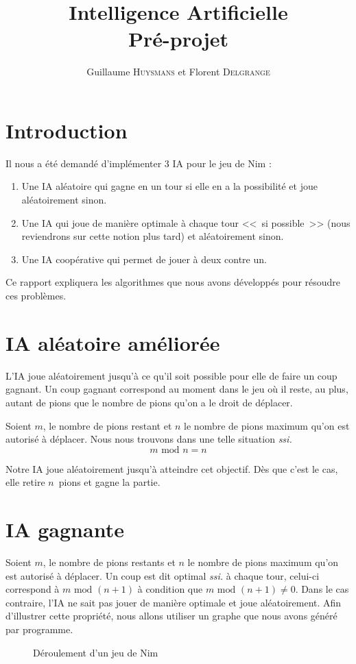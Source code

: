 \documentclass[10pt,a4paper]{article}
\author{Guillaume \textsc{Huysmans} et Florent \textsc{Delgrange}}
\title{Intelligence Artificielle\\Pré-projet}
\newcommand{\ssi}{\textit{ssi. }}
\renewcommand{\mod}{\text{ mod }}
\begin{document}
\maketitle
\section{Introduction}
Il nous a été demandé d'implémenter 3 IA pour le jeu de Nim :
\begin{enumerate}
\item Une IA aléatoire qui gagne en un tour si elle en a la possibilité et joue
	aléatoirement sinon.
\item Une IA qui joue de manière optimale à chaque tour <<~si possible~>>
	(nous reviendrons sur cette notion plus tard) et aléatoirement sinon.
\item Une IA coopérative qui permet de jouer à deux contre un.
\end{enumerate}

Ce rapport expliquera les algorithmes que nous avons développés
pour résoudre ces problèmes.

\section{IA aléatoire améliorée}
L'IA joue aléatoirement jusqu'à ce qu'il soit possible pour elle de faire un
coup gagnant. Un coup gagnant correspond au moment dans le jeu où il reste, au
plus, autant de pions que le nombre de pions qu'on a le droit de déplacer.

Soient $m$, le nombre de pions restant et $n$ le nombre de pions maximum qu'on
est autorisé à déplacer. Nous nous trouvons dans une telle situation \ssi
\[m \mod n = n\]

Notre IA joue aléatoirement jusqu'à atteindre cet objectif.
Dès que c'est le cas, elle retire $n$~pions et gagne la partie.

\section{IA gagnante}
Soient $m$, le nombre de pions restants et $n$ le nombre de pions maximum qu'on
est autorisé à déplacer. Un coup est dit optimal \ssi à chaque tour,
celui-ci correspond à $m \mod (n+1)$ à condition que $m \mod (n+1) \neq 0$.
Dans le cas contraire, l'IA ne sait pas jouer de manière optimale et joue
aléatoirement.
Afin d'illustrer cette propriété, nous allons utiliser un
graphe que nous avons généré par programme.
\begin{figure}
\label{nim12}
\caption{Déroulement d'un jeu de Nim}
\end{figure}
\end{document}
